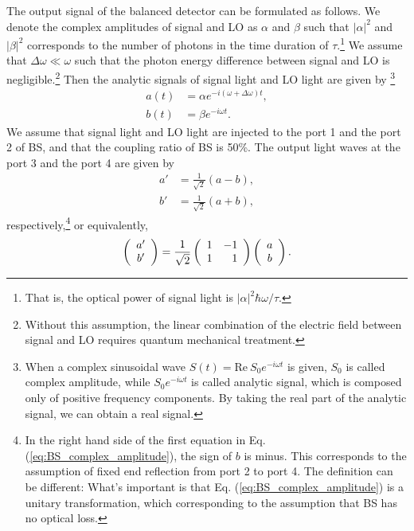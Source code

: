 The output signal of the balanced detector can be formulated as follows. We denote the complex amplitudes of signal and LO as $\alpha$ and $\beta$ such that $|\alpha|^2$ and $|\beta|^2$ corresponds to the number of photons in the time duration of $\tau$.\footnote{That is, the optical power of signal light is $|\alpha|^2\hbar \omega/\tau$.} We assume that $\Delta \omega \ll \omega$ such that the photon energy difference between signal and LO is negligible.\footnote{Without this assumption, the linear combination of the electric field between signal and LO requires quantum mechanical treatment.} Then the analytic signals of signal light and LO light are given by
\footnote{When a complex sinusoidal wave $S(t)=\mathrm{Re} \ S_0 e^{-i\omega t}$ is given, $S_0$ is called complex amplitude, while $S_0 e^{-i\omega t}$ is called analytic signal, which is composed only of positive frequency components. By taking the real part of the analytic signal, we can obtain a real signal.}
\begin{equation}
\begin{aligned}
	a(t) &= \alpha e^{-i(\omega + \Delta \omega)t},\\
  	b(t) &= \beta e^{-i\omega t}.
\end{aligned}\label{eq:complex_amplitude}
\end{equation}
We assume that signal light and LO light are injected to the port 1 and the port 2 of BS, and that the coupling ratio of BS is 50\%. The output light waves at the port 3 and the port 4 are given by
\begin{equation}
\begin{aligned}
  a' &= \frac{1}{\sqrt 2}(a - b),\\
  b' &= \frac{1}{\sqrt 2}(a + b),
\end{aligned}\label{eq:BS_complex_amplitude}
\end{equation}
respectively,\footnote{In the right hand side of the first equation in Eq. (\ref{eq:BS_complex_amplitude}), the sign of $b$ is minus. This corresponds to the assumption of fixed end reflection from port 2 to port 4. The definition can be different: What's important is that Eq. (\ref{eq:BS_complex_amplitude}) is a unitary transformation, which corresponding to the assumption that BS has no optical loss.}
or equivalently,
\begin{equation}
  \left( \begin{array}{c}
  	a' \\ b'
  \end{array}
  \right) =
  \frac{1}{\sqrt 2}\left( \begin{array}{r r} 
  	1 & -1 \\ 1 & 1
 \end{array}
	\right)
	\left( \begin{array}{c}
		a \\ b
	\end{array} \right).
	\label{eq:beamsplitter_matrix}
\end{equation}
